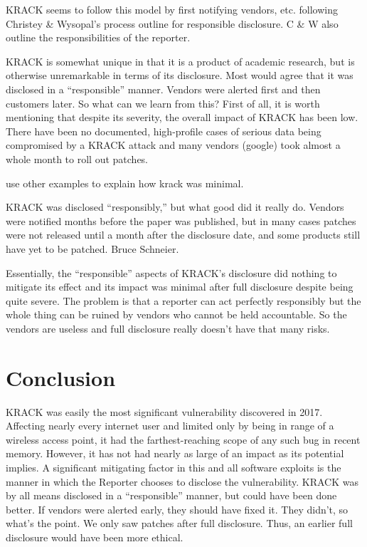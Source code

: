\documentclass[12pt]{article}
\begin{document}
\begin{doublespace}
KRACK seems to follow this model by first notifying vendors, etc. following
Christey \& Wysopal's process outline for responsible disclosure. C \& W also
outline the responsibilities of the reporter.

KRACK is somewhat unique in that it is a product of academic research, but is
otherwise unremarkable in terms of its disclosure. Most would agree that it
was disclosed in a ``responsible'' manner. Vendors were alerted first and then
customers later. So what can we learn from this? First of all, it is worth
mentioning that despite its severity, the overall impact of KRACK has been low.
There have been no documented, high-profile cases of serious data being
compromised by a KRACK attack and many vendors (google) took almost a whole
month to roll out patches.

use other examples to explain how krack was minimal.

KRACK was disclosed ``responsibly,'' but what good did it really do. Vendors
were notified months before the paper was published, but in many cases patches
were not released until a month after the disclosure date, and some products
still have yet to be patched. Bruce Schneier.

Essentially, the ``responsible'' aspects of KRACK's disclosure did nothing to
mitigate its effect and its impact was minimal after full disclosure despite
being quite severe. The problem is that a reporter can act perfectly
responsibly but the whole thing can be ruined by vendors who cannot be held
accountable. So the vendors are useless and full disclosure really doesn't 
have that many risks.

\section*{Conclusion}
KRACK was easily the most significant vulnerability discovered in 2017.
Affecting nearly every internet user and limited only by being in range of a
wireless access point, it had the farthest-reaching scope of any such bug in
recent memory. However, it has not had nearly as large of an impact as its
potential implies. A significant mitigating factor in this and all software
exploits is the manner in which the Reporter chooses to disclose the
vulnerability. KRACK was by all means disclosed in a ``responsible'' manner,
but could have been done better. If vendors were alerted early, they should
have fixed it. They didn't, so what's the point. We only saw patches after full
disclosure. Thus, an earlier full disclosure would have been more ethical.


\end{doublespace}
\newpage
\end{document}
